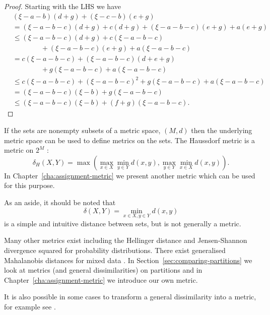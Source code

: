 \documentclass[a4paper]{report}
\begin{document}
\begin{proof}
  Starting with the LHS we have
  \begin{align*}
    &(\xi -a-b)(d+g)+(\xi -c-b)(e+g)\\
    &= (\xi -a-b-c)(d+g)+c(d+g)+(\xi -a-b-c)(e+g)+a(e+g)\\
    &\leq (\xi -a-b-c)(d+g)+c(\xi -a-b-c)\\
    &\qquad\qquad+(\xi -a-b-c)(e+g)+a(\xi -a-b-c)\\
    &= c(\xi -a-b-c)+(\xi -a-b-c)(d+e+g)\\
    &\qquad\qquad+g(\xi -a-b-c)+a(\xi -a-b-c)\\
    &\leq c(\xi -a-b-c)+(\xi -a-b-c)^2+g(\xi -a-b-c)+a(\xi -a-b-c)\\
    &= (\xi -a-b-c)(\xi -b)+g(\xi -a-b-c)\\
    &\leq (\xi -a-b-c)(\xi -b) + (f+g)(\xi -a-b-c).
  \end{align*}
\end{proof}

If the sets are nonempty subsets of a metric space, $(M,d)$ then the
underlying metric space can be used to define metrics on the sets.  The
Haussdorf metric is a metric on $2^{M}$ \citep{braun2003geometry}:
\begin{equation*}
  \delta_{H}(X,Y) = \max(\max_{x \in X} \min_{y \in Y} d(x,y),
                        \max_{y \in Y} \min_{x \in X} d(x,y)).
\end{equation*}
In Chapter~\ref{cha:assignment-metric} we present another metric which can be
used for this purpose.

As an aside, it should be noted that
\begin{equation*}
  \delta(X,Y) = \min_{x \in X, y \in Y} d(x,y)
\end{equation*}
is a simple and intuitive distance between sets, but is not generally a
metric.

Many other metrics exist including the Hellinger distance and Jensen-Shannon
divergence squared \citep{endres03metric} for probability distributions.
There exist generalised Mahalanobis distances for mixed data
\citep{leon2005generalized}.  In Section~\ref{sec:comparing-partitions} we
look at metrics (and general dissimilarities) on partitions and in
Chapter~\ref{cha:assignment-metric} we introduce our own metric.

It is also possible in some cases to transform a general dissimilarity into a
metric, for example see \citet[chap. 2.5]{everitt80}.
\end{document}
